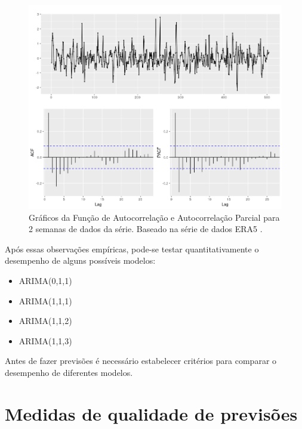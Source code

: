 \documentclass[
	12pt,				%
	openright,			%
	oneside,			%
	a4paper,			%
	english,			%
	french,				%
	spanish,			%
	brazil				%
	]{abntex2}
\begin{document}
\begin{figure}[h]
    \centering
	\includegraphics[width=\textwidth]{last3weeks_acf.png}
	\caption{Gráficos da Função de Autocorrelação e Autocorrelação Parcial para 2 semanas de dados da série. Baseado na série de dados ERA5 \cite{era5}.}
\end{figure}
\FloatBarrier 

Após essas observações empíricas, pode-se testar quantitativamente o desempenho de alguns possíveis modelos:

\begin{itemize}
	\item ARIMA(0,1,1)
	\item ARIMA(1,1,1)
	\item ARIMA(1,1,2)
	\item ARIMA(1,1,3)
\end{itemize}

Antes de fazer previsões é necessário estabelecer critérios para comparar o desempenho de diferentes modelos.

\section{Medidas de qualidade de previsões}\label{erro}
\end{document}
